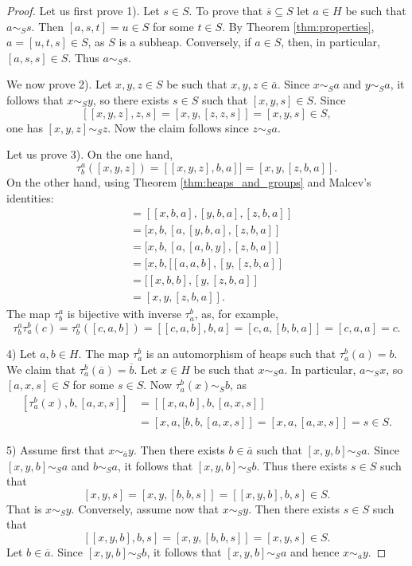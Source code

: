 \documentclass[graybox]{svmult}
\begin{document}
\begin{proof}
    Let us first prove 1). Let $s\in S$. To prove that 
    $\overline{s}\subseteq S$ let 
    $a\in H$ be such that $a\sim_Ss$. Then 
    $[a,s,t]=u\in S$ for some $t\in S$. By Theorem \ref{thm:properties}, 
    $a=[u,t,s]\in S$, as $S$ is a subheap. Conversely, 
    if $a\in S$, then, in particular, $[a,s,s]\in S$. Thus 
    $a\sim_Ss$. 

    We now prove 2). Let $x,y,z\in S$ be such that $x,y,z\in\overline{a}$. 
    Since $x\sim_Sa$ and $y\sim_Sa$, it follows that 
    $x\sim_Sy$, so there exists $s\in S$ such that $[x,y,s]\in S$.
    Since  
    \[
    [[x,y,z],z,s]=[x,y,[z,z,s]]=[x,y,s]\in S, 
    \]
    one has $[x,y,z]\sim_Sz$. Now the claim follows since 
    $z\sim_Sa$.
    
    Let us prove 3). On the one hand,
    \[
    \tau_b^a([x,y,z])=[[x,y,z],b,a]]=[x,y,[z,b,a]].
    \]
    On the other hand, using Theorem \ref{thm:heaps_and_groups}
    and Malcev's identities:
    \begin{align*}
        [\tau_b^a(x),\tau_b^a(y),\tau_b^a(z)] &= 
        [[x,b,a],[y,b,a],[z,b,a]]\\
        &=[x,b,[a,[y,b,a],[z,b,a]]\\
        &=[x,b,[a,[a,b,y],[z,b,a]]\\
        &=[x,b,[[a,a,b],[y,[z,b,a]]\\
        &=[[x,b,b],[y,[z,b,a]]\\
        &=[x,y,[z,b,a]].
    \end{align*}
    The map $\tau_b^a$ is bijective with inverse $\tau_a^b$, as, 
    for example, 
    \[
    \tau_b^a\tau_a^b(c)
    =\tau_b^a([c,a,b])=[[c,a,b],b,a]=[c,a,[b,b,a]]=[c,a,a]=c.
    \]
    
    4) Let $a,b\in H$. The map $\tau_a^b$ is an automorphism of heaps
    such that $\tau_a^b(a)=b$. We claim that 
    $\tau_a^b(\overline{a})=\overline{b}$. Let $x\in H$ be such that 
    $x\sim_Sa$. In particular, $a\sim_Sx$, so 
    $[a,x,s]\in S$ for some $s\in S$. Now 
    $\tau_a^b(x)\sim_Sb$, as 
    \begin{align*}
    \left[\tau_a^b(x),b,[a,x,s]\right]&=\left[[x,a,b],b,[a,x,s]\right]\\
    &=\left[x,a,[b,b,[a,x,s]\right]
    =\left[x,a,[a,x,s]\right]=s\in S.
    \end{align*}
    
    5) Assume first that $x\sim_{\overline{a}}y$. Then there exists $b\in\overline{a}$ 
    such that $[x,y,b]\sim_Sa$. Since $[x,y,b]\sim_Sa$ and $b\sim_Sa$, it follows
    that $[x,y,b]\sim_Sb$. Thus there exists $s\in S$
    such that 
    \[
    [x,y,s]=[x,y,[b,b,s]]=[[x,y,b],b,s]\in S.
    \]
    That is $x\sim_Sy$. Conversely, assume now that $x\sim_Sy$. Then 
    there exists $s\in S$ such that 
    \[
    [[x,y,b],b,s]=[x,y,[b,b,s]]=[x,y,s]\in S.
    \]
    Let $b\in\overline{a}$. Since $[x,y,b]\sim_Sb$, it follows that 
    $[x,y,b]\sim_Sa$ and hence $x\sim_{\overline{a}}y$. 
\end{proof}
\end{document}
